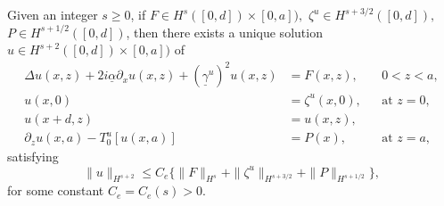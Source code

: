\vskip 0.1in
\begin{theorem} Given an integer $s\ge 0$, if $F\in H^s([0,d])\times [0,a]),$ $\zeta^u \in H^{s+3/2}([0,d]),$ $P\in H^{s+1/2}([0,d])$, then there exists a unique solution $u\in H^{s+2}([0,d])\times [0,a])$ of
\begin{subequations}
\begin{align}
\Delta u(x,z) +2i\underline{\alpha}\partial_{x}u(x,z)+(\underline{\gamma}^u)^2u(x,z)&=F(x,z), && \text{$0<z<a$},\\
u(x,0)&=\zeta^u(x,0), && \text{at $z=0$},\\
u(x+d,z)&=u(x,z),\\
\partial_z u(x,a)-T_0^u[u(x,a)] &= P(x), && \text{at $z=a$},
\end{align}
\end{subequations}
satisfying 
\begin{equation}\|u\|_{H^{s+2}}\le C_e\{\|F\|_{H^{s}}+\|\zeta^u\|_{H^{s+3/2}}+\|P\|_{H^{s+1/2}}  \}, \end{equation}
for some constant $C_e = C_e(s) > 0$.
\end{theorem}
\vspace{1 mm}
